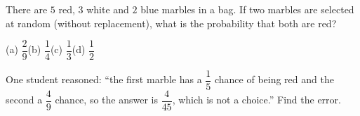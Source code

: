There are $5$ red, $3$ white and $2$ blue marbles in a bag. If two marbles are selected at random (without replacement), what is the probability that both are red?

(a) $\dfrac{2}{9}$\qquad (b) $\dfrac{1}{4}$\qquad (c) $\dfrac{1}{3}$\qquad (d) $\dfrac{1}{2}$

One student reasoned: ``the first marble has a $\dfrac{1}{5}$ chance of being red and the second a $\dfrac{4}{9}$ chance, so the answer is $\dfrac{4}{45}$, which is not a choice.'' Find the error.
